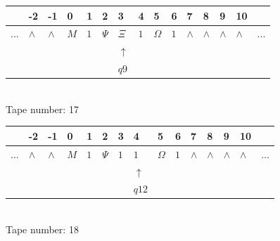 \documentclass[11pt]{article}
\begin{document}
\begin{table}[H]
\centering
\begin{tabular}{lllllllllllllll}
 & -2 & -1 & 0 & 1 & 2 & 3 & 4 & 5 & 6 & 7 & 8 & 9 & 10 & \\
\hline
$...$ & \multicolumn{1}{|l|}{$\wedge$} & \multicolumn{1}{|l|}{$\wedge$} & \multicolumn{1}{|l|}{$M$} & \multicolumn{1}{|l|}{$1$} & \multicolumn{1}{|l|}{$\Psi$} & \multicolumn{1}{|l|}{$\Xi$} & \multicolumn{1}{|l|}{$1$} & \multicolumn{1}{|l|}{$\Omega$} & \multicolumn{1}{|l|}{$1$} & \multicolumn{1}{|l|}{$\wedge$} & \multicolumn{1}{|l|}{$\wedge$} & \multicolumn{1}{|l|}{$\wedge$} & \multicolumn{1}{|l|}{$\wedge$} & $...$\\
\hline
&  &  &  &  &  & $\uparrow$ &  &  &  &  &  &  &  &  \\
&  &  &  &  &  & $ q9 $ &  &  &  &  &  &  &  &  \\
\end{tabular}
\\
Tape number: 17
\noindent\makebox[\linewidth]{\hdashrule{\textwidth}{1pt}{1pt}}\end{table}
\clearpage

\begin{table}[H]
\centering
\begin{tabular}{lllllllllllllll}
 & -2 & -1 & 0 & 1 & 2 & 3 & 4 & 5 & 6 & 7 & 8 & 9 & 10 & \\
\hline
$...$ & \multicolumn{1}{|l|}{$\wedge$} & \multicolumn{1}{|l|}{$\wedge$} & \multicolumn{1}{|l|}{$M$} & \multicolumn{1}{|l|}{$1$} & \multicolumn{1}{|l|}{$\Psi$} & \multicolumn{1}{|l|}{$1$} & \multicolumn{1}{|l|}{$1$} & \multicolumn{1}{|l|}{$\Omega$} & \multicolumn{1}{|l|}{$1$} & \multicolumn{1}{|l|}{$\wedge$} & \multicolumn{1}{|l|}{$\wedge$} & \multicolumn{1}{|l|}{$\wedge$} & \multicolumn{1}{|l|}{$\wedge$} & $...$\\
\hline
&  &  &  &  &  &  & $\uparrow$ &  &  &  &  &  &  &  \\
&  &  &  &  &  &  & $ q12 $ &  &  &  &  &  &  &  \\
\end{tabular}
\\
Tape number: 18
\noindent\makebox[\linewidth]{\hdashrule{\textwidth}{1pt}{1pt}}\end{table}
\end{document}
